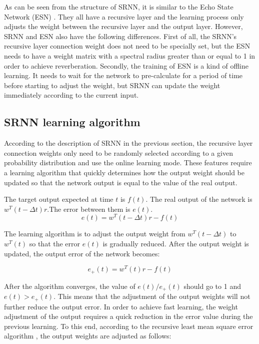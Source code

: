 \documentclass[runningheads]{llncs}
\begin{document}
As can be seen from the structure of SRNN, it is similar to the Echo 
State Network (ESN) \cite{RN22}.
They all have a recursive layer and the learning process only adjusts 
the weight between the recursive layer and the output layer. However, 
SRNN and ESN also have the following differences. First of all, 
the SRNN's recursive layer connection weight does not need to be 
specially set, but the ESN needs to have a weight matrix with a 
spectral radius greater than or equal to 1 in order to achieve reverberation.
Secondly, the training of ESN is a kind of offline learning. It needs to wait 
for the network to pre-calculate for a period of time before starting to
adjust the weight, but SRNN can update the weight immediately according 
to the current input.

\subsection{SRNN learning algorithm}
According to the description of SRNN in the previous section, 
the recursive layer connection weights only need to be randomly 
selected according to a given probability distribution and use the 
online learning mode. These features require a learning algorithm 
that quickly determines how the output weight should be 
updated so that the network output is equal to the value of the 
real output.

The target output expected at time $t$ is $f(t)$. The real 
output of the network is $w^T (t-\Delta t) r$.The error between them is $e(t)$.
\begin{equation}
e(t)= w^T (t -\Delta t)r-f(t)
\end{equation}

The learning algorithm is to adjust the output weight 
from $w^T (t -\Delta t)$ to $w^T (t)$ so that the error $e(t)$ is gradually reduced.
After the output weight is updated, the output error of the network becomes:

\begin{equation}
e_+(t)= w^T (t)r-f(t)
\end{equation}

After the algorithm converges, the value of $e(t)/e_+ (t)$ should go to 1 and $e(t)>e_+(t)$.
This means that the adjustment of the output weights will not further 
reduce the output error. In order to achieve fast learning,
the weight adjustment of the output requires a quick reduction 
in the error value during the previous learning. To this end, 
according to the recursive least mean square error algorithm \cite{RN23}, 
the output weights are adjusted as follows:
\end{document}
